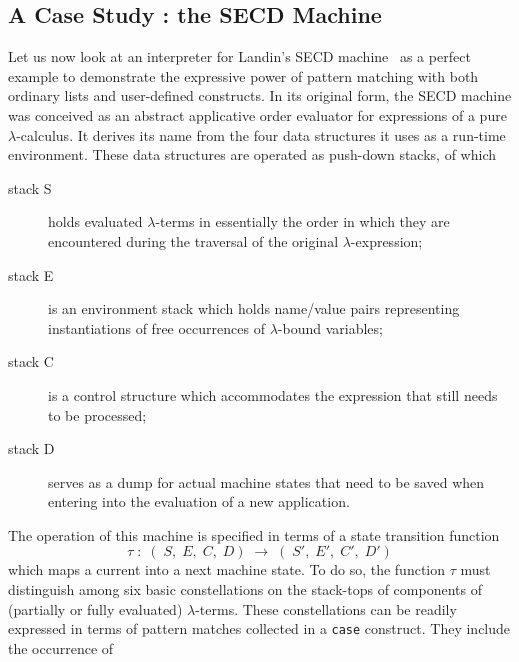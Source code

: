 \subsection{A Case Study : the SECD Machine}
Let us now look at an interpreter for Landin's {\mys SECD machine}~\cite{land64} 
as a perfect example to demonstrate the expressive power of pattern matching
with both ordinary lists and user-defined constructs.
In its original form, the SECD machine was conceived as
an abstract applicative order
evaluator for expressions of a pure $\lambda$-calculus. It derives its name
from the four data structures it uses as a run-time environment. These 
data structures are operated as {\mys push-down stacks}, of which
\begin{description}
\item[{\mys stack S}] holds evaluated $\lambda$-terms in essentially the
order in which they are encountered during the traversal of the original
$\lambda$-expression;
\item[{\mys stack E}] is an environment stack which holds name/value pairs
 representing instantiations of free occurrences of $\lambda$-bound
variables;
\item[{\mys stack C}] is a control structure which 
accommodates the expression that still needs to be processed;
\item[{\mys stack D}] serves as a dump for actual machine states that need to be saved when entering into the evaluation of a new application.
\end{description}
The operation of this machine is specified in terms of a state transition
function
$$
\tau\;:\;(\;S,\;E,\;C,\;D)\;\rightarrow\;(\;S',\;E',\;C',\;D')
$$
which maps a current into a next machine state. To do so, the function $\tau$
must distinguish among six basic constellations on the stack-tops
 of components of (partially or fully evaluated) $\lambda$-terms. These
constellations can be readily expressed in terms of pattern matches
collected in a {\tt case} construct. They include the occurrence of
